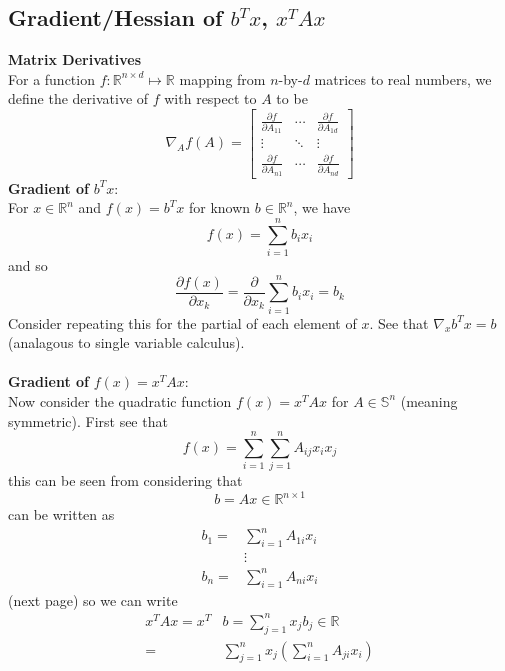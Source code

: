 \documentclass{report}
\begin{document}
\subsection{Gradient/Hessian of $b^Tx$, $x^TAx$}
\textbf{Matrix Derivatives}\\
For a function $f:\mathbb{R}^{n\times d}\mapsto\mathbb{R}$ mapping from $n$-by-$d$ matrices to real numbers,
we define the derivative of $f$ with respect to $A$ to be
\begin{equation*}
\nabla_Af(A)=\begin{bmatrix}
\frac{\partial f}{\partial A_{11}}&\cdots&\frac{\partial f}{\partial A_{1d}}\\
\vdots&\ddots&\vdots\\
\frac{\partial f}{\partial A_{n1}}&\cdots&\frac{\partial f}{\partial A_{nd}}
\end{bmatrix}
\end{equation*}
\textbf{Gradient of} $b^Tx$:\\
For $x\in\mathbb{R}^n$ and $f(x)=b^Tx$ for known $b\in\mathbb{R}^n$, we have
\begin{equation*}
f(x)=\sum^n_{i=1}b_ix_i
\end{equation*}
and so
\begin{equation*}
\frac{\partial f(x)}{\partial x_k}=\frac{\partial}{\partial x_k}\sum^n_{i=1}b_ix_i=b_k
\end{equation*}
Consider repeating this for the partial of each element of $x$. See that $\nabla_xb^Tx=b$ (analagous to
single variable calculus).\\
\vspace{1mm}\\
\textbf{Gradient of} $f(x)=x^TAx$:\\
Now consider the quadratic function $f(x)=x^TAx$ for $A\in\mathbb{S}^n$ (meaning symmetric). First see that
\begin{equation*}
f(x)=\sum^n_{i=1}\sum^n_{j=1}A_{ij}x_ix_j
\end{equation*}
this can be seen from considering that 
\begin{equation*}
b=Ax\in\mathbb{R}^{n\times1}
\end{equation*}
can be written as
\begin{align*}
b_1=&\sum^n_{i=1}A_{1i}x_i\\
&\vdots\\
b_n=&\sum^n_{i=1}A_{ni}x_i
\end{align*}
(next page)
\newpage
\noindent so we can write
\begin{align*}
x^TAx=x^T&b=\sum^n_{j=1}x_jb_j\in\mathbb{R}\\
=&\sum^n_{j=1}x_j\left(\sum^n_{i=1}A_{ji}x_i\right)
\end{align*}
\end{document}
